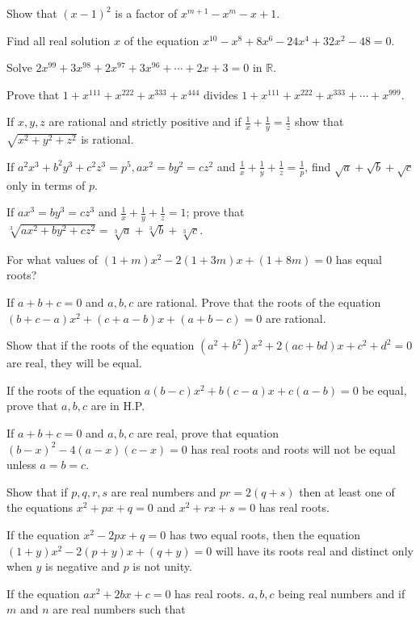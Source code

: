 \item Show that $(x - 1)^2$ is a factor of $x^{m + 1} - x^m - x + 1$.
\item Find all real solution $x$ of the equation $x^{10} - x^{8} + 8x^6 - 24x^4 + 32x^2 - 48 = 0$.
\item Solve $2x^{99} + 3x^{98} + 2x^{97} + 3x^{96} + \cdots + 2x + 3 = 0$ in $\mathbb{R}$.
\item Prove that $1 + x^{111} + x^{222} + x^{333} + x^{444}$ divides $1 + x^{111} + x^{222} + x^{333} +
  \cdots + x^{999}$.
\item If $x, y, z$ are rational and strictly positive and if $\frac{1}{x} + \frac{1}{y} = \frac{1}{z}$ show
  that $\sqrt{x^2 + y^2 + z^2}$ is rational.
\item If $a^2x^3 + b^2y^3 + c^2z^3 = p^5, ax^2 = by^2 = cz^2$ and $\frac{1}{x} + \frac{1}{y} + \frac{1}{z} =
  \frac{1}{p}$, find $\sqrt{a} + \sqrt{b} + \sqrt{c}$ only in terms of $p$.
\item If $ax^3 = by^3 = cz^3$ and $\frac{1}{x} + \frac{1}{y} + \frac{1}{z} = 1$; prove that $\sqrt[3]{ax^2 +
  by^2 + cz^2} = \sqrt[3]{a} + \sqrt[3]{b} + \sqrt[3]{c}$.
\item For what values of $(1 + m)x^2 - 2(1 + 3m)x + (1 + 8m) = 0$ has equal roots?
\item If $a + b + c = 0$ and $a,b,c$ are rational. Prove that the roots of the equation $(b + c - a)x^2 + (c + a - b)x + (a + b -
  c) = 0$ are rational.
\item Show that if the roots of the equation $(a^2 + b^2)x^2 + 2(ac + bd)x + c^2 + d^2 = 0$ are real, they will be equal.
\item If the roots of the equation $a(b - c)x^2 + b(c - a)x + c(a - b) = 0$ be equal, prove that $a, b, c$ are in H.P.
\item If $a + b + c = 0$ and $a,b,c$ are real, prove that equation $(b - x)^2 - 4(a - x)(c - x) = 0$ has real roots and roots will
  not be equal unless $a=b=c$.
\item Show that if $p,q,r,s$ are real numbers and $pr = 2(q + s)$ then at least one of the equations $x^2 + px + q = 0$ and $x^2 +
  rx + s = 0$ has real roots.
\item If the equation $x^2 - 2px + q = 0$ has two equal roots, then the equation $(1 + y)x^2 - 2(p + y)x + (q + y) = 0$ will have
  its roots real and distinct only when $y$ is negative and $p$ is not unity.
\item If the equation $ax^2 + 2bx + c = 0$ has real roots. $a,b,c$ being real numbers and if $m$ and $n$ are real numbers such that
